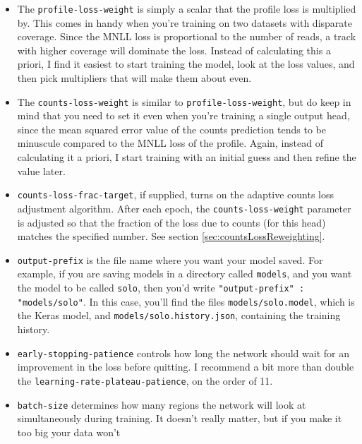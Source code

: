 \documentclass{article}
\begin{document}
\begin{itemize}
    \item The \texttt{profile-loss-weight} is simply a scalar that the profile loss is multiplied
        by. This comes in handy when you're training on two datasets with disparate coverage.
        Since the MNLL loss is proportional to the number of reads, a track with higher
        coverage will dominate the loss. Instead of calculating this a priori, I find it
        easiest to start training the model, look at the loss values, and then pick
        multipliers that will make them about even.
    \item The \texttt{counts-loss-weight} is similar to \texttt{profile-loss-weight}, but do keep
        in mind that you need to set it even when you're training a single output head, since
        the mean squared error value of the counts prediction tends to be minuscule compared
        to the MNLL loss of the profile. Again, instead of calculating it a priori, I start
        training with an initial guess and then refine the value later.
    \item \texttt{counts-loss-frac-target}, if supplied, turns on the adaptive counts loss
        adjustment algorithm. After each epoch, the \texttt{counts-loss-weight} parameter
        is adjusted so that the fraction of the loss due to counts (for this head)
        matches the specified number. See section \ref{sec:countsLossReweighting}.
    \item \begin{sloppypar}
            \texttt{output-prefix} is the file name where you want your model saved.
        For example, if you are saving models in a directory called \texttt{models}, and you
        want the model to be called \texttt{solo}, then you'd write
        \verb|"output-prefix" : "models/solo"|. In this case, you'll find the files
        \texttt{models/solo.model}, which is the Keras model, and
        \texttt{models/solo.history.json}, containing the training history.
    \end{sloppypar}
    \item \texttt{early-stopping-patience} controls how long the network should wait for an
        improvement in the loss before quitting. I recommend a bit more than double the
        \texttt{learning-rate-plateau-patience}, on the order of 11.
    \item \texttt{batch-size} determines how many regions the network will look at simultaneously
        during training. It doesn't really matter, but if you make it too big your data won't

\end{itemize}
\end{document}
